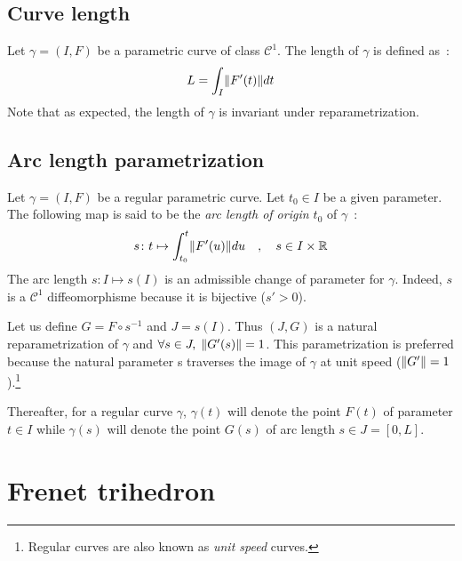 \subsection{Curve length}
Let $\gamma=(I,F)$ be a parametric curve of class ${\mathcal{C}}^{1}$. The length of $\gamma$ is defined as~:
\begin{equation}
	L=\int_{I}\lVert F'(t)\rVert dt
\end{equation}
Note that as expected, the length of $\gamma$ is invariant under reparametrization.

\subsection{Arc length parametrization}\label{sec=arclength_param}

Let $\gamma=(I,F)$ be a regular parametric curve. Let $t_0 \in I$ be a given parameter. The following map is said to be the \emph{arc length of origin $t_0$} of $\gamma$~:
\begin{equation}
	s \colon t \mapsto \int_{t_{0}}^{t}\lVert F'(u)\rVert du
	\quad,\quad
	s \in I \times \mathbb{R}
\end{equation}
The arc length $s \colon I\mapsto s(I)$ is an admissible change of parameter for $\gamma$. Indeed, $s$ is a ${\mathcal{C}}^{1}$ diffeomorphisme because it is bijective ($s'>0$).

Let us define $G=F\circ s^{-1}$ and $J=s(I)$. Thus $(J,G)$ is a natural reparametrization of $\gamma$ and  $\forall s \in J,\; \lVert G'(s)\rVert = 1$. This parametrization is preferred because the natural parameter s traverses the image of $\gamma$ at unit speed ($\lVert G'\rVert = 1$).\footnote{Regular curves are also known as \emph{unit speed} curves.}

Thereafter, for a regular curve $\gamma$, $\gamma(t)$ will denote the point $F(t)$ of parameter $t \in I$ while $\gamma(s)$ will denote the point $G(s)$ of arc length $s \in J=[0,L]$.


\section{Frenet trihedron}\label{sec=frenet_trihedron}

